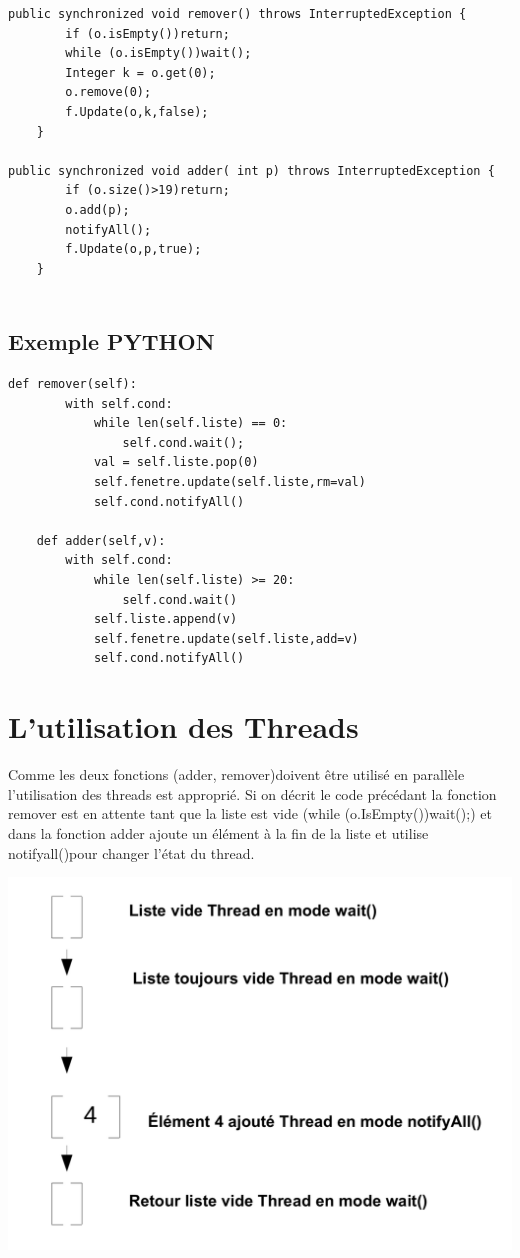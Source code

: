 \documentclass[13pt]{article}
\begin{document}
\begin{verbatim}
public synchronized void remover() throws InterruptedException {
        if (o.isEmpty())return;
        while (o.isEmpty())wait();
        Integer k = o.get(0);
        o.remove(0);
        f.Update(o,k,false);
    }
	
public synchronized void adder( int p) throws InterruptedException {
        if (o.size()>19)return;
        o.add(p);
        notifyAll();
        f.Update(o,p,true);
    }
	
\end{verbatim}

\subsection{Exemple PYTHON}
\begin{verbatim}
def remover(self):
        with self.cond:
            while len(self.liste) == 0:
                self.cond.wait();
            val = self.liste.pop(0)
            self.fenetre.update(self.liste,rm=val)
            self.cond.notifyAll()
        
    def adder(self,v):
        with self.cond:
            while len(self.liste) >= 20:
                self.cond.wait()
            self.liste.append(v)
            self.fenetre.update(self.liste,add=v)
            self.cond.notifyAll()
\end{verbatim}
\section{L'utilisation des Threads}
Comme les deux fonctions (adder, remover)doivent être utilisé en parallèle l'utilisation des threads est approprié. Si on décrit le code précédant la fonction remover est en attente tant que la liste est vide (while (o.IsEmpty())wait();) et dans la fonction adder ajoute un élément à la fin de la liste et utilise notifyall()pour changer l'état du thread.

\includegraphics[scale=0.5]{image3.png}
\end{document}
